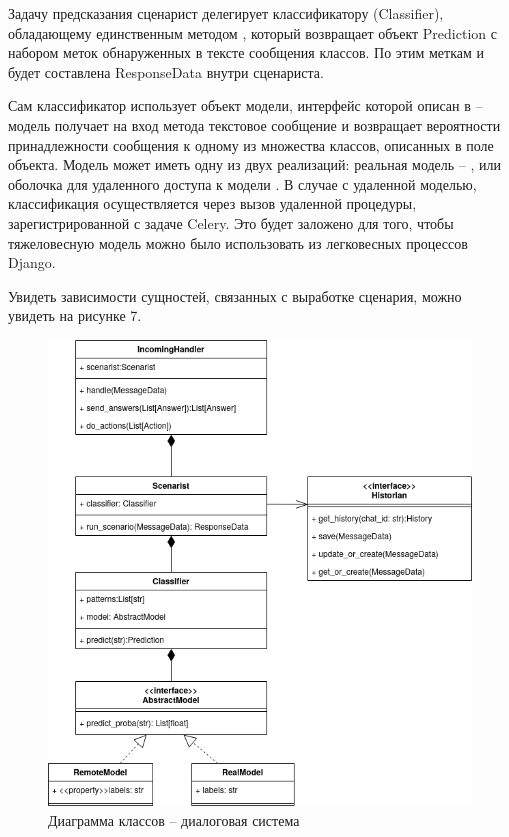     Задачу предсказания сценарист делегирует классификатору (Classifier),
    обладающему единственным методом , который
    возвращает объект Prediction с набором меток обнаруженных в тексте сообщения
    классов. По этим меткам и будет составлена ResponseData внутри сценариста.

    Сам классификатор использует объект модели, интерфейс которой описан в
     -- модель получает на вход метода
     текстовое сообщение и возвращает
    вероятности принадлежности сообщения к одному из множества классов,
    описанных в поле  объекта. Модель может
    иметь одну из двух реализаций: реальная модель -- ,
    или оболочка для удаленного доступа к модели .
    В случае с удаленной моделью, классификация осуществляется через вызов
    удаленной процедуры, зарегистрированной с задаче Celery.
    Это будет заложено для того, чтобы тяжеловесную модель можно было использовать
    из легковесных процессов Django.

    Увидеть зависимости сущностей, связанных с выработке сценария, можно увидеть
    на рисунке 7.
    \begin{figure}[H]
        \centering
        \includegraphics[width=0.8\linewidth]{static/ClassDiagram_classifier.png}
        \caption{Диаграмма классов -- диалоговая система}
        \label{fig:class-diagram-classifier}
    \end{figure}


